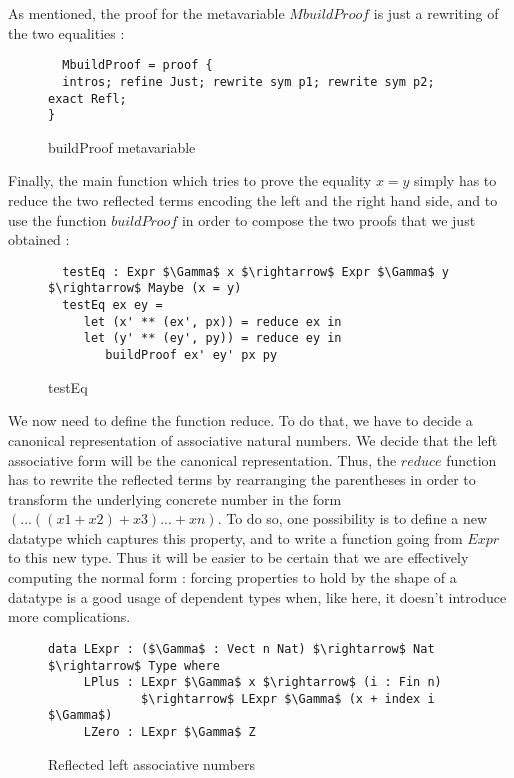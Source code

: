 As mentioned, the proof for the metavariable $MbuildProof$ is just a rewriting of the two equalities :

\begin{figure}[H]
\figrule
\begin{center}
\begin{lstlisting}
  MbuildProof = proof {
  intros; refine Just; rewrite sym p1; rewrite sym p2; exact Refl;
}  
\end{lstlisting}
\end{center}
\caption{buildProof metavariable}
\figrule
\end{figure}

Finally, the main function which tries to prove the equality $x=y$ simply has to reduce the two reflected terms encoding the left and the right hand side, and to use the function $buildProof$ in order to compose the two proofs that we just obtained :

\begin{figure}[H]
\figrule
\begin{center}
\begin{lstlisting}
  testEq : Expr $\Gamma$ x $\rightarrow$ Expr $\Gamma$ y $\rightarrow$ Maybe (x = y)
  testEq ex ey = 
     let (x' ** (ex', px)) = reduce ex in 
     let (y' ** (ey', py)) = reduce ey in
        buildProof ex' ey' px py 
\end{lstlisting}
\end{center}
\caption{testEq}
\figrule
\end{figure}

We now need to define the function reduce. To do that, we have to decide a canonical representation of associative natural numbers. We decide that the left associative form will be the canonical representation. Thus, the $reduce$ function has to rewrite the reflected terms by rearranging the parentheses in order to transform the underlying concrete number in the form $(...((x1 + x2) + x3) ... + xn)$. To do so, one possibility is to define a new datatype which captures this property, and to write a function going from $Expr$ to this new type. Thus it will be easier to be certain that we are effectively computing the normal form : forcing properties to hold by the shape of a datatype is a good usage of dependent types when, like here, it doesn't introduce more complications.

\begin{figure}[H]
\figrule
\begin{center}
\begin{lstlisting}
data LExpr : ($\Gamma$ : Vect n Nat) $\rightarrow$ Nat $\rightarrow$ Type where
     LPlus : LExpr $\Gamma$ x $\rightarrow$ (i : Fin n) 
             $\rightarrow$ LExpr $\Gamma$ (x + index i $\Gamma$)
     LZero : LExpr $\Gamma$ Z
\end{lstlisting}
\end{center}
\caption{Reflected left associative numbers}
\figrule
\end{figure}


